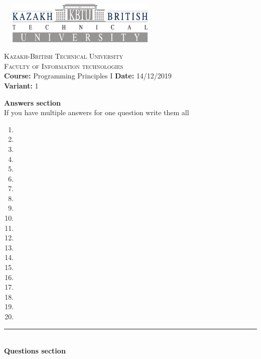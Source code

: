 \documentclass[10pt]{article}
\begin{document}
\begin{center}
\includegraphics[width=8cm, height=2cm]{kbtu.jpg}
\end{center}

\begin{center}
	\begin{minipage}{11.4cm}
		\begin{center}
				{\small \textsc{Kazakh-British Technical University}			\\
						  \textsc{Faculty of Information technologies} \\
                         \textbf{Course:} Programming Principles I \hspace{.65cm}\textbf{Date:} 14/12/2019\\\textbf{Variant:} 1\\
                }
		\end{center}
	\end{minipage}
\end{center}
\textbf{
{Answers section}\\
}
{If you have multiple answers for one question write them all}
\begin{multicols}{5}
\begin{enumerate}
\item \item \item \item \item \item \item \item \item \item \item \item \item \item \item \item \item \item \item \item
\end{enumerate}
\end{multicols}
\medskip\hrule
\textbf{
\\
{Questions section}\\
}
\end{document}
